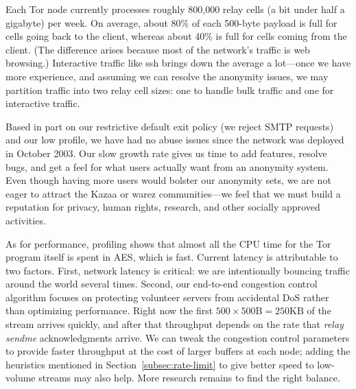 \documentclass[times,10pt,twocolumn]{article}
\begin{document}
Each Tor node currently processes roughly 800,000 relay
cells (a bit under half a gigabyte) per week. On average, about 80\%
of each 500-byte payload is full for cells going back to the client,
whereas about 40\% is full for cells coming from the client. (The difference
arises because most of the network's traffic is web browsing.) Interactive
traffic like ssh brings down the average a lot---once we have more
experience, and assuming we can resolve the anonymity issues, we may
partition traffic into two relay cell sizes: one to handle
bulk traffic and one for interactive traffic.

Based in part on our restrictive default exit policy (we
reject SMTP requests) and our low profile, we have had no abuse
issues since the network was deployed in October
2003. Our slow growth rate gives us time to add features,
resolve bugs, and get a feel for what users actually want from an
anonymity system.  Even though having more users would bolster our
anonymity sets, we are not eager to attract the Kazaa or warez
communities---we feel that we must build a reputation for privacy, human
rights, research, and other socially approved activities.

As for performance, profiling shows that almost all the CPU time for the
Tor program itself is spent in AES, which is fast.  Current latency is
attributable
to two factors. First, network latency is critical: we are
intentionally bouncing traffic around the world several times. Second,
our end-to-end congestion control algorithm focuses on protecting
volunteer servers from accidental DoS rather than optimizing
performance. Right now the first $500 \times 500\mbox{B}=250\mbox{KB}$
of the stream arrives
quickly, and after that throughput depends on the rate that \emph{relay
sendme} acknowledgments arrive. We can tweak the congestion control
parameters to provide faster throughput at the cost of
larger buffers at each node; adding the heuristics mentioned in
Section~\ref{subsec:rate-limit} to give better speed to low-volume
streams may also help. More research remains to find the
right balance.
\end{document}

